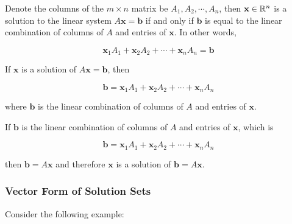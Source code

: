\documentclass[a4paper,12pt]{article}
\begin{document}
\begin{thm}
  Denote the columns of the $m\times n$ matrix be $A_{1},A_{2},\cdots,A_{n}$, then $\mathbf{x}\in\mathbb{R}^{n}$ is a solution to the linear system $A\mathbf{x}=\mathbf{b}$ if and only if $\mathbf{b}$ is equal to the linear combination of columns of $A$ and entries of $\mathbf{x}$. In other words,

  $$\mathbf{x}_{1}A_{1}+\mathbf{x}_{2}A_{2}+\cdots+\mathbf{x}_{n}A_{n}=\mathbf{b}$$\s

  \prf\arr If $\mathbf{x}$ is a solution of $A\mathbf{x}=\mathbf{b}$, then

  $$\mathbf{b}=\mathbf{x}_{1}A_{1}+\mathbf{x}_{2}A_{2}+\cdots+\mathbf{x}_{n}A_{n}$$\s

  where $\mathbf{b}$ is the linear combination of columns of $A$ and entries of $\mathbf{x}$.\n

  \arl If $\mathbf{b}$ is the linear combination of columns of $A$ and entries of $\mathbf{x}$, which is

  $$\mathbf{b}=\mathbf{x}_{1}A_{1}+\mathbf{x}_{2}A_{2}+\cdots+\mathbf{x}_{n}A_{n}$$\s

  then $\mathbf{b}=A\mathbf{x}$ and therefore $\mathbf{x}$ is a solution of $\mathbf{b}=A\mathbf{x}$.
\end{thm}

\subsubsection{Vector Form of Solution Sets}
Consider the following example:\n
\end{document}
